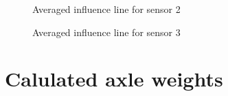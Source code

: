 \begin{figure}[H]
	\begin{adjustbox}{center}
		
	\end{adjustbox}
	\caption{Averaged influence line for sensor 2}
	\label{fig:infl_avg_sensor2_standard}
\end{figure}


\begin{figure}[H]
	\begin{adjustbox}{center}
		
	\end{adjustbox}
	\caption{Averaged influence line for sensor 3}
	\label{fig:infl_avg_sensor3_standard}
\end{figure}

\newpage
\section{Calulated axle weights}

